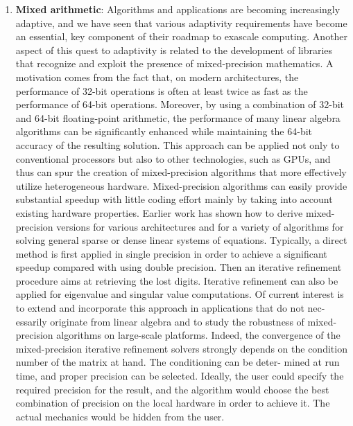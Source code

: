 \begin{enumerate}
	\item \textbf{Mixed arithmetic}: Algorithms and applications are becoming increasingly adaptive, and we have seen that various adaptivity requirements have become an essential, key component of their roadmap to exascale computing. Another aspect of this quest to adaptivity is related to the development of libraries that recognize and exploit the presence of mixed-precision mathematics. A motivation comes from the fact that, on modern architectures, the performance of 32-bit operations is often at least twice as fast as the performance of 64-bit operations. Moreover, by using a combination of 32-bit and 64-bit floating-point arithmetic, the performance of many linear algebra algorithms can be significantly enhanced while maintaining the 64-bit accuracy of the resulting solution. This approach can be applied not only to conventional processors but also to other technologies, such as GPUs, and thus can spur the creation of mixed-precision algorithms that more effectively utilize heterogeneous hardware. Mixed-precision algorithms can easily provide substantial speedup with little coding effort mainly by taking into account existing hardware properties. Earlier work has shown how to derive mixed-precision versions for various architectures and for a variety of algorithms for solving general sparse or dense linear systems of equations. Typically, a direct method is first applied in single precision in order to achieve a significant speedup compared with using double precision. Then an iterative refinement procedure aims at retrieving the lost digits. Iterative refinement can also be applied for eigenvalue and singular value computations. Of current interest is to extend and incorporate this approach in applications that do not nec- essarily originate from linear algebra and to study the robustness of mixed-precision algorithms on large-scale platforms. Indeed, the convergence of the mixed-precision iterative refinement solvers strongly depends on the condition number of the matrix at hand. The conditioning can be deter- mined at run time, and proper precision can be selected. Ideally, the user could specify the required precision for the result, and the algorithm would choose the best combination of precision on the local hardware in order to achieve it. The actual mechanics would be hidden from the user.
	

\end{enumerate}
